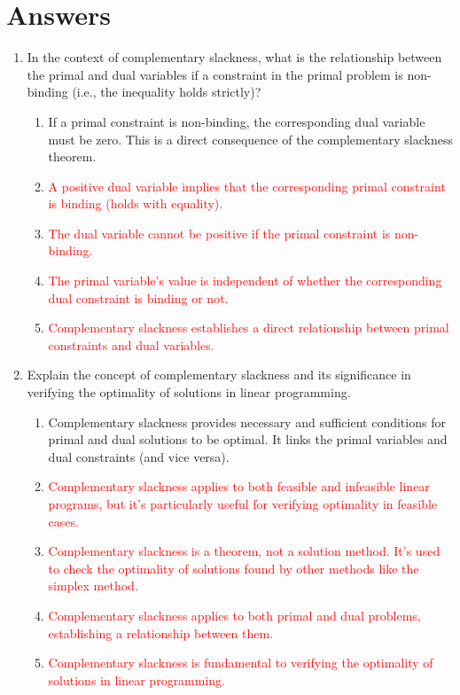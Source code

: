 \documentclass{article}%
\newcommand{\incorrect}[1]{\textcolor{red}{#1}}
\begin{document}
%
\newpage%
\section{Answers}%
\label{sec:Answers}%
\begin{enumerate}%
\item In the context of complementary slackness, what is the relationship between the primal and dual variables if a constraint in the primal problem is non-binding (i.e., the inequality holds strictly)?%
\begin{enumerate}%
\item If a primal constraint is non-binding, the corresponding dual variable must be zero. This is a direct consequence of the complementary slackness theorem.%
\item \incorrect{A positive dual variable implies that the corresponding primal constraint is binding (holds with equality).}%
\item \incorrect{The dual variable cannot be positive if the primal constraint is non-binding.}%
\item \incorrect{The primal variable's value is independent of whether the corresponding dual constraint is binding or not.}%
\item \incorrect{Complementary slackness establishes a direct relationship between primal constraints and dual variables.}%
\end{enumerate}%
\vspace{1em}%
\item Explain the concept of complementary slackness and its significance in verifying the optimality of solutions in linear programming.%
\begin{enumerate}%
\item Complementary slackness provides necessary and sufficient conditions for primal and dual solutions to be optimal.  It links the primal variables and dual constraints (and vice versa).%
\item \incorrect{Complementary slackness applies to both feasible and infeasible linear programs, but it's particularly useful for verifying optimality in feasible cases.}%
\item \incorrect{Complementary slackness is a theorem, not a solution method. It's used to check the optimality of solutions found by other methods like the simplex method.}%
\item \incorrect{Complementary slackness applies to both primal and dual problems, establishing a relationship between them.}%
\item \incorrect{Complementary slackness is fundamental to verifying the optimality of solutions in linear programming.}%

\end{enumerate}
\end{enumerate}
\end{document}
